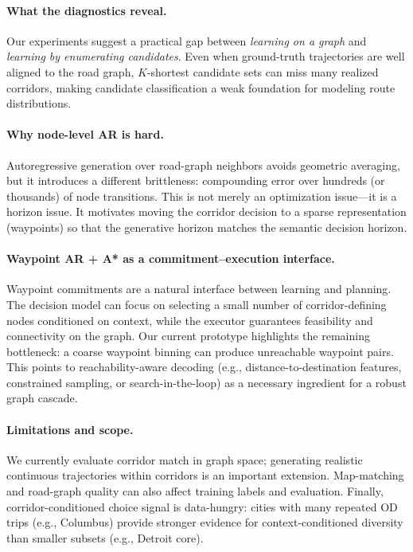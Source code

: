 \paragraph{What the diagnostics reveal.}
Our experiments suggest a practical gap between \emph{learning on a graph} and \emph{learning by enumerating candidates}.
Even when ground-truth trajectories are well aligned to the road graph, $K$-shortest candidate sets can miss many realized corridors, making candidate classification a weak foundation for modeling route distributions.

\paragraph{Why node-level AR is hard.}
Autoregressive generation over road-graph neighbors avoids geometric averaging, but it introduces a different brittleness: compounding error over hundreds (or thousands) of node transitions.
This is not merely an optimization issue---it is a horizon issue.
It motivates moving the corridor decision to a sparse representation (waypoints) so that the generative horizon matches the semantic decision horizon.

\paragraph{Waypoint AR + A* as a commitment--execution interface.}
Waypoint commitments are a natural interface between learning and planning.
The decision model can focus on selecting a small number of corridor-defining nodes conditioned on context, while the executor guarantees feasibility and connectivity on the graph.
Our current prototype highlights the remaining bottleneck: a coarse waypoint binning can produce unreachable waypoint pairs.
This points to reachability-aware decoding (e.g., distance-to-destination features, constrained sampling, or search-in-the-loop) as a necessary ingredient for a robust graph cascade.

\paragraph{Limitations and scope.}
We currently evaluate corridor match in graph space; generating realistic continuous trajectories within corridors is an important extension.
Map-matching and road-graph quality can also affect training labels and evaluation.
Finally, corridor-conditioned choice signal is data-hungry: cities with many repeated OD trips (e.g., Columbus) provide stronger evidence for context-conditioned diversity than smaller subsets (e.g., Detroit core).
